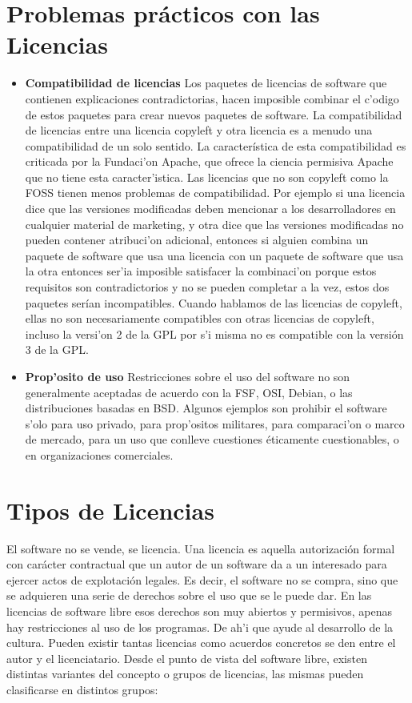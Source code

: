 \documentclass{book}
\begin{document}
\section {Problemas pr\'acticos con las Licencias}
\begin{itemize}
	\item {\bf Compatibilidad de licencias}
Los paquetes de licencias de software que contienen explicaciones contradictorias, hacen imposible combinar el c'odigo de estos paquetes para crear nuevos paquetes de software. La compatibilidad de licencias entre una licencia copyleft y otra licencia es a menudo una compatibilidad de un solo sentido. La característica de esta compatibilidad es criticada por la Fundaci'on Apache, que ofrece la ciencia permisiva Apache que no tiene esta caracter'istica. Las licencias que no son copyleft como la FOSS tienen menos problemas de compatibilidad. Por ejemplo si una licencia dice que las versiones modificadas deben mencionar a los desarrolladores en cualquier material de marketing, y otra dice que las versiones modificadas no pueden contener atribuci'on adicional, entonces si alguien combina un paquete de software que usa una licencia con un paquete de software que usa la otra entonces ser'ia imposible satisfacer la combinaci'on porque estos requisitos son contradictorios y no se pueden completar a la vez, estos dos paquetes serían incompatibles. Cuando hablamos de las licencias de copyleft, ellas no son necesariamente compatibles con otras licencias de copyleft, incluso la versi'on 2 de la GPL por s'i misma no es compatible con la versión 3 de la GPL.
	\item {\bf Prop'osito de uso}
Restricciones sobre el uso del software no son generalmente aceptadas de acuerdo con la FSF, OSI, Debian, o las distribuciones basadas en BSD. Algunos ejemplos son prohibir el software s'olo para uso privado, para prop'ositos militares, para comparaci'on o marco de mercado, para un uso que conlleve cuestiones éticamente cuestionables, o en organizaciones comerciales.
\end{itemize}
\newpage
\section {Tipos de Licencias}
El software no se vende, se licencia. Una licencia es aquella autorización formal con carácter contractual que un autor de un software da a un interesado para ejercer actos de explotación legales. Es decir, el software no se compra, sino que se adquieren una serie de derechos sobre el uso que se le puede dar. En las licencias de software libre esos derechos son muy abiertos y permisivos, apenas hay restricciones al uso de los programas. De ah'i que ayude al desarrollo de la cultura. Pueden existir tantas licencias como acuerdos concretos se den entre el autor y el licenciatario. Desde el punto de vista del software libre, existen distintas variantes del concepto o grupos de licencias, las mismas pueden clasificarse en distintos grupos:\\
\end{document}

